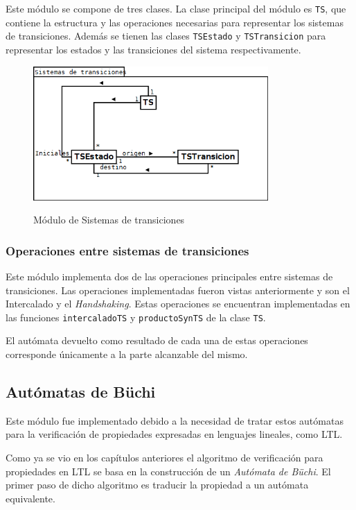 Este módulo se compone de tres clases.
La clase principal del módulo es \texttt{TS}, que contiene la estructura y las operaciones
 necesarias para representar los sistemas de transiciones.
Además se tienen las clases \texttt{TSEstado} y \texttt{TSTransicion} para representar
 los estados y las transiciones del sistema respectivamente.

\begin{figure}[hbtp]
\begin{center}
\caption{Módulo de Sistemas de transiciones}
\includegraphics[width=0.8\textwidth]{mc/imagenes/ts.png}
\label{fig:modulo_TS}
\end{center}
\end{figure}

\subsubsection{Operaciones entre sistemas de transiciones}
Este módulo implementa dos de las operaciones principales entre sistemas de
 transiciones.
Las operaciones implementadas fueron vistas anteriormente y son el Intercalado y el
 \textit{Handshaking}.
Estas operaciones se encuentran implementadas en las funciones \texttt{intercaladoTS}
 y \texttt{productoSynTS} de la clase \texttt{TS}.

El autómata devuelto como resultado de cada una de estas operaciones corresponde únicamente
 a la parte alcanzable del mismo.

\subsection{Autómatas de Büchi}	
Este módulo fue implementado debido a la necesidad de tratar estos autómatas para la
 verificación de propiedades expresadas en lenguajes lineales, como LTL.

Como ya se vio en los capítulos anteriores el algoritmo de verificación para propiedades en
 LTL se basa en la construcción de un \textit{Autómata de Büchi}.
El primer paso de dicho algoritmo es traducir la propiedad a un autómata equivalente.

